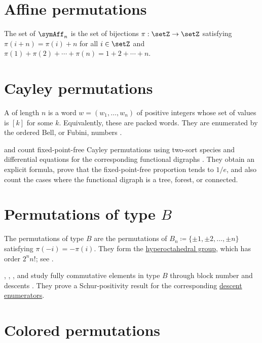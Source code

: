 

\section[notationAffinePermutations]{Affine permutations}

The set of  $\symAff_n$ is the set of bijections $\pi: \setZ \to \setZ$
satisfying $\pi(i+n)=\pi(i)+n$ for all $i\in \setZ$ and $\pi(1)+\pi(2)+\dotsb+\pi(n)=1+2+\dotsb+n$.


\section[permutationsCayley]{Cayley permutations}

A  of length $n$ is a word
$w=(w_1,\dotsc,w_n)$ of positive integers whose set of values is $[k]$ for
some $k$.  Equivalently, these are packed words.
They are enumerated by the ordered Bell, or Fubini, numbers
.

 and  count fixed-point-free Cayley
permutations using two-sort species and differential equations for the
corresponding functional digraphs \cite{CerbaiClaesson2025x}.  They obtain an
explicit formula, prove that the fixed-point-free proportion tends to $1/e$,
and also count the cases where the functional digraph is a tree, forest, or
connected.


\section[permutationsTypeB]{Permutations of type $B$}

The permutations of type $B$ are the permutations of
$B_n\coloneqq\{\pm1,\pm2,\dotsc,\pm n\}$ satisfying
$\pi(-i)=-\pi(i)$.  They form the
\hyperref[weylLieGroups]{hyperoctahedral group}, which has order
$2^n n!$; see .

, , , and
 study fully commutative elements in type $B$ through
block number and descents \cite{BagnoBiagioliJouhetRoichman2022}.  They prove
a Schur-positivity result for the corresponding
\hyperref[ex:typeBEulerianSturm]{descent enumerators}.


\section[permutationsColored]{Colored permutations}

